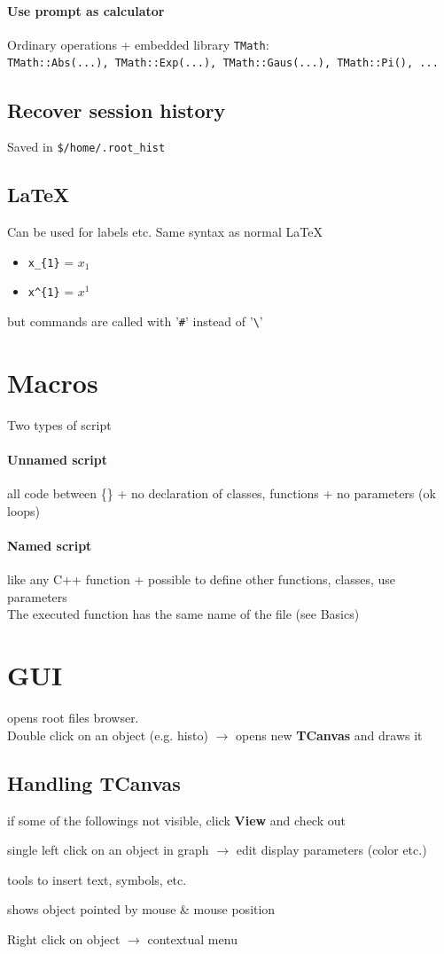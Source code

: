 \documentclass[10pt, oneside]{article}
\begin{document}
\paragraph{Use prompt as calculator}
Ordinary operations + embedded library \texttt{TMath}:
\\\texttt{TMath::Abs(...), TMath::Exp(...), TMath::Gaus(...), TMath::Pi(), ...}
\subsection{Recover session history}
Saved in \texttt{\$/home/.root\_hist}

\subsection{\LaTeX{}}
Can be used for labels etc. Same syntax as normal \LaTeX{}
\begin{itemize}
\item \verb^x_{1}^ = $x_1$
\item \verb_x^{1}_ = $x^1$
\end{itemize}
but commands are called with '\texttt{\#}' instead of '\texttt{\textbackslash}'

\section{Macros}
Two types of script
\paragraph{Unnamed script} all code between \{\} + no declaration of classes, functions + no parameters (ok loops)
\paragraph{Named script} like any C++ function + possible to define other functions, classes, use parameters
\\The executed function has the same name of the file (see Basics)

\section{GUI}
 opens root files browser. 
\\Double click on an object (e.g. histo) $\rightarrow$ opens new \textbf{TCanvas} and draws it
\subsection*{Handling TCanvas}
if some of the followings not visible, click \textbf{View} and check out
\begin{description}
\item[Editor] single left click on an object in graph $\rightarrow$ edit display parameters (color etc.)
\item[Toolbar] tools to insert text, symbols, etc.
\item[Status bar] shows object pointed by mouse \& mouse position
\item Right click on object $\rightarrow$ contextual menu
\end{description}
\end{document}
